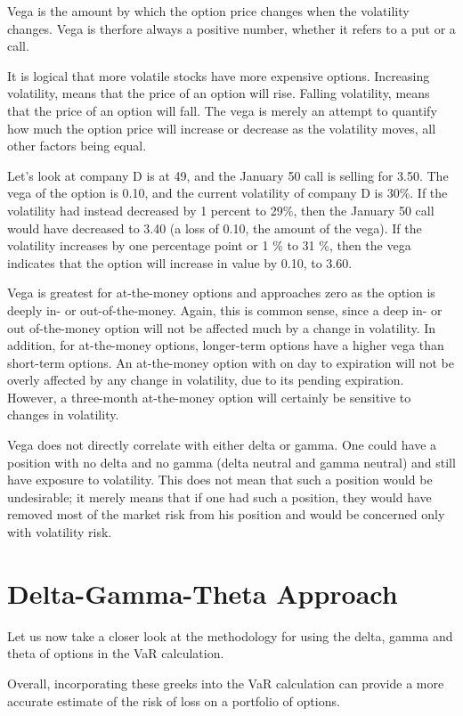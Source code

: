 \documentclass[a4paper, 12pt]{article}
\theoremstyle{definition}
\theoremstyle{plain}
\begin{document}
Vega is the amount by which the option price changes when the
volatility changes. Vega is therfore always a positive number, whether it refers to
a put or a call. 

It is logical that more volatile stocks have more expensive options. 
Increasing volatility, means that the price of an option will rise. 
Falling volatility, means that the price of an option will fall. 
The vega is merely an attempt to quantify how much the
option price will increase or decrease as the volatility moves, 
all other factors being equal. 

Let's look at company D is at 49, and the January 50 call is selling for 3.50. The
vega of the option is 0.10, and the current volatility of company D is 30\%.
If the volatility had instead decreased by 1 percent to 29\%, then the January 50
call would have decreased to 3.40 (a loss of 0.10, the amount of the vega).
If the volatility increases by one percentage point or 1 \% to 31 \%, then the vega
indicates that the option will increase in value by 0.10, to 3.60. 

Vega is greatest for at-the-money options and approaches zero as the option is
deeply in- or out-of-the-money. Again, this is common sense, since a deep in- or out
of-the-money option will not be affected much by a change in volatility. In addition,
for at-the-money options, longer-term options have a higher vega than short-term
options. An at-the-money option with on
day to expiration will not be overly affected by any change in volatility, due to its
pending expiration. However, a three-month at-the-money option will certainly be
sensitive to changes in volatility.

Vega does not directly correlate with either delta or gamma. One could have a
position with no delta and no gamma (delta neutral and gamma neutral) and still have
exposure to volatility. This does not mean that such a position would be undesirable;
it merely means that if one had such a position, they would have removed most of the
market risk from his position and would be concerned only with volatility risk. 

\section{Delta-Gamma-Theta Approach}

Let us now take a closer look 
at the methodology for using  
the delta, gamma and theta of 
options in the VaR calculation. 


Overall, incorporating these greeks into the VaR calculation 
can provide a more accurate estimate of the risk of 
loss on a portfolio of options.
\end{document}
